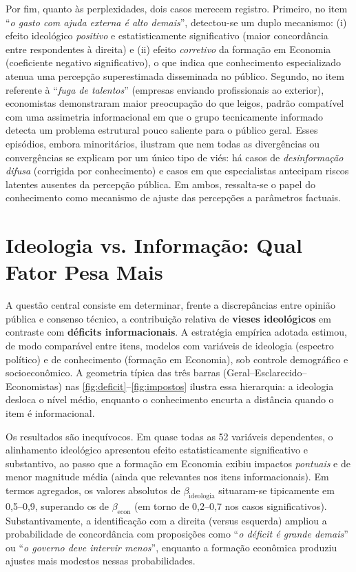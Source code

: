 Por fim, quanto às perplexidades, dois casos merecem registro. Primeiro, no item ``\textit{o gasto com ajuda externa é alto demais}'', detectou-se um duplo mecanismo: (i) efeito ideológico \textit{positivo} e estatisticamente significativo (maior concordância entre respondentes à direita) e (ii) efeito \textit{corretivo} da formação em Economia (coeficiente negativo significativo), o que indica que conhecimento especializado atenua uma percepção superestimada disseminada no público. Segundo, no item referente à ``\textit{fuga de talentos}'' (empresas enviando profissionais ao exterior), economistas demonstraram maior preocupação do que leigos, padrão compatível com uma assimetria informacional em que o grupo tecnicamente informado detecta um problema estrutural pouco saliente para o público geral. Esses episódios, embora minoritários, ilustram que nem todas as divergências ou convergências se explicam por um único tipo de viés: há casos de \textit{desinformação difusa} (corrigida por conhecimento) e casos em que especialistas antecipam riscos latentes ausentes da percepção pública. Em ambos, ressalta-se o papel do conhecimento como mecanismo de ajuste das percepções a parâmetros factuais.

\section{Ideologia vs. Informação: Qual Fator Pesa Mais}

A questão central consiste em determinar, frente a discrepâncias entre opinião pública e consenso técnico, a contribuição relativa de \textbf{vieses ideológicos} em contraste com \textbf{déficits informacionais}. A estratégia empírica adotada estimou, de modo comparável entre itens, modelos com variáveis de ideologia (espectro político) e de conhecimento (formação em Economia), sob controle demográfico e socioeconômico. A geometria típica das três barras (Geral–Esclarecido–Economistas) nas \autoref{fig:deficit}–\autoref{fig:impostos} ilustra essa hierarquia: a ideologia desloca o nível médio, enquanto o conhecimento encurta a distância quando o item é informacional.

Os resultados são inequívocos. Em quase todas as 52 variáveis dependentes, o alinhamento ideológico apresentou efeito estatisticamente significativo e substantivo, ao passo que a formação em Economia exibiu impactos \textit{pontuais} e de menor magnitude média (ainda que relevantes nos itens informacionais). Em termos agregados, os valores absolutos de $\beta_{\text{ideologia}}$ situaram-se tipicamente em 0{,}5--0{,}9, superando os de $\beta_{\text{econ}}$ (em torno de 0{,}2--0{,}7 nos casos significativos). Substantivamente, a identificação com a direita (versus esquerda) ampliou a probabilidade de concordância com proposições como ``\textit{o déficit é grande demais}'' ou ``\textit{o governo deve intervir menos}'', enquanto a formação econômica produziu ajustes mais modestos nessas probabilidades.

